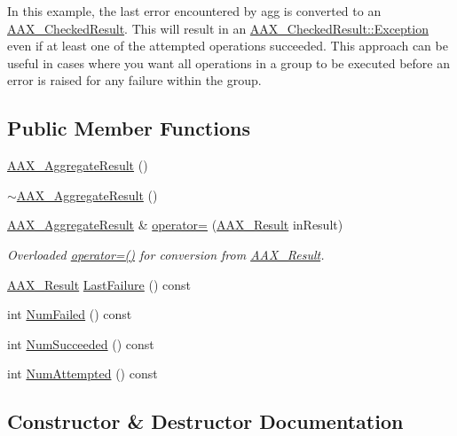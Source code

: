 In this example, the last error encountered by {\ttfamily agg} is converted to an \hyperlink{a00019}{A\+A\+X\+\_\+\+Checked\+Result}. This will result in an \hyperlink{a00019_a36fd71afc6d62993c1dd96e1ca9fcc0e}{A\+A\+X\+\_\+\+Checked\+Result\+::\+Exception} even if at least one of the attempted operations succeeded. This approach can be useful in cases where you want all operations in a group to be executed before an error is raised for any failure within the group. \subsection*{Public Member Functions}
\begin{DoxyCompactItemize}
\item 
\hyperlink{a00009_a3e17eec78bd6568cf167a86be008e081}{A\+A\+X\+\_\+\+Aggregate\+Result} ()
\item 
\hyperlink{a00009_a09e9058ca4ec5df47741cef7e44cf165}{$\sim$\+A\+A\+X\+\_\+\+Aggregate\+Result} ()
\item 
\hyperlink{a00009}{A\+A\+X\+\_\+\+Aggregate\+Result} \& \hyperlink{a00009_a352314f927d81c236d8022b277853155}{operator=} (\hyperlink{a00149_a4d8f69a697df7f70c3a8e9b8ee130d2f}{A\+A\+X\+\_\+\+Result} in\+Result)
\begin{DoxyCompactList}\small\item\em Overloaded {\ttfamily \hyperlink{a00009_a352314f927d81c236d8022b277853155}{operator=()}} for conversion from \hyperlink{a00149_a4d8f69a697df7f70c3a8e9b8ee130d2f}{A\+A\+X\+\_\+\+Result}. \end{DoxyCompactList}\item 
\hyperlink{a00149_a4d8f69a697df7f70c3a8e9b8ee130d2f}{A\+A\+X\+\_\+\+Result} \hyperlink{a00009_aedeb567f840d34ad2332c92f248efe6e}{Last\+Failure} () const 
\item 
int \hyperlink{a00009_a1f1a21e08269fd16cf97b5b6bc26643a}{Num\+Failed} () const 
\item 
int \hyperlink{a00009_a57659c5fddcb7fd4c7fcdfcc381b9af8}{Num\+Succeeded} () const 
\item 
int \hyperlink{a00009_a66bfecf5ea3313c1414311760a50aa56}{Num\+Attempted} () const 
\end{DoxyCompactItemize}


\subsection{Constructor \& Destructor Documentation}
\hypertarget{a00009_a3e17eec78bd6568cf167a86be008e081}{}
